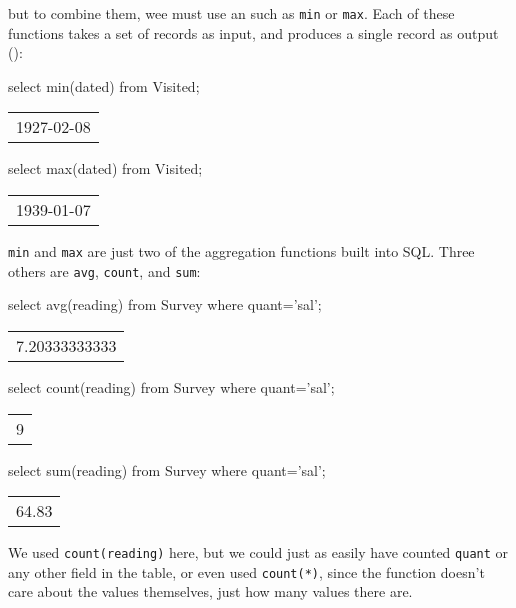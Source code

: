 \documentclass{book}
\begin{document}
but to combine them, wee must use an
 such as
\texttt{min} or \texttt{max}. Each of these functions takes a set of
records as input, and produces a single record as output
():

\begin{VerbIn}
select min(dated) from Visited;
\end{VerbIn}

\begin{tabular}{l}
1927-02-08 \\
\end{tabular}


\begin{VerbIn}
select max(dated) from Visited;
\end{VerbIn}

\begin{tabular}{l}
1939-01-07 \\
\end{tabular}

\texttt{min} and \texttt{max} are just two of the aggregation functions
built into SQL. Three others are \texttt{avg}, \texttt{count}, and
\texttt{sum}:

\begin{VerbIn}
select avg(reading) from Survey where quant='sal';
\end{VerbIn}

\begin{tabular}{l}
7.20333333333 \\
\end{tabular}

\begin{VerbIn}
select count(reading) from Survey where quant='sal';
\end{VerbIn}

\begin{tabular}{l}
9 \\
\end{tabular}

\begin{VerbIn}
select sum(reading) from Survey where quant='sal';
\end{VerbIn}

\begin{tabular}{l}
64.83 \\
\end{tabular}

We used \texttt{count(reading)} here, but we could just as easily have
counted \texttt{quant} or any other field in the table, or even used
\texttt{count(*)}, since the function doesn't care about the values
themselves, just how many values there are.
\end{document}
